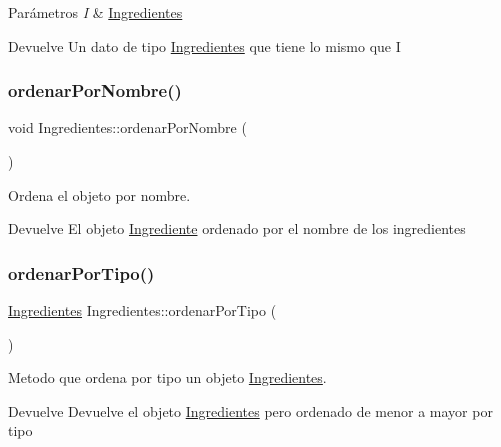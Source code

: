 \begin{DoxyParams}{Parámetros}
{\em I} & \hyperlink{classIngredientes}{Ingredientes} \\
\hline
\end{DoxyParams}
\begin{DoxyReturn}{Devuelve}
Un dato de tipo \hyperlink{classIngredientes}{Ingredientes} que tiene lo mismo que I 
\end{DoxyReturn}
\mbox{\label{classIngredientes_a6cd27f6353a430fae6db51695dac95b5}} 
\subsubsection{\texorpdfstring{ordenar\+Por\+Nombre()}{ordenarPorNombre()}}
{\footnotesize\ttfamily void Ingredientes\+::ordenar\+Por\+Nombre (\begin{DoxyParamCaption}{ }\end{DoxyParamCaption})}



Ordena el objeto por nombre. 

\begin{DoxyReturn}{Devuelve}
El objeto \hyperlink{classIngrediente}{Ingrediente} ordenado por el nombre de los ingredientes 
\end{DoxyReturn}
\mbox{\label{classIngredientes_a0ed6997b0c31498c42562d91a6df955d}} 
\subsubsection{\texorpdfstring{ordenar\+Por\+Tipo()}{ordenarPorTipo()}}
{\footnotesize\ttfamily \hyperlink{classIngredientes}{Ingredientes} Ingredientes\+::ordenar\+Por\+Tipo (\begin{DoxyParamCaption}{ }\end{DoxyParamCaption})}



Metodo que ordena por tipo un objeto \hyperlink{classIngredientes}{Ingredientes}. 

\begin{DoxyReturn}{Devuelve}
Devuelve el objeto \hyperlink{classIngredientes}{Ingredientes} pero ordenado de menor a mayor por tipo 
\end{DoxyReturn}
\mbox{\label{classIngredientes_aca2d4295b616fd0efeafce91009e0dda}} 
